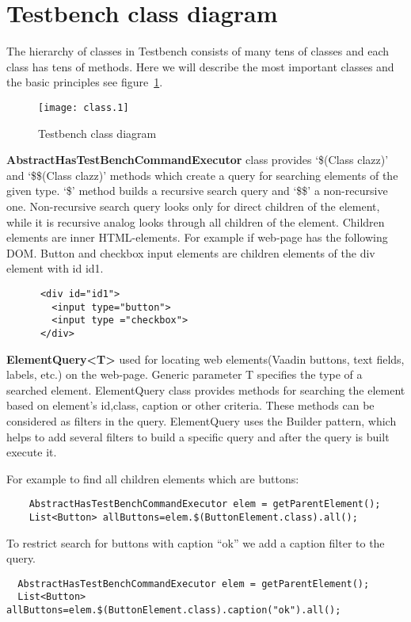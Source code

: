   \section{Testbench class diagram}

  The hierarchy of classes in Testbench consists of many tens of classes and each class has tens of methods.
  Here we will describe the most important classes and the basic principles see
  figure~\ref{fig:classdiagram}.
	\begin{figure}
		\label{fig:classdiagram}
	    \texttt{[image: class.1]}
	    \caption{Testbench class diagram}
    \end{figure}
    
\textbf{AbstractHasTestBenchCommandExecutor} class provides  `\$(Class clazz)'
and `\$\$(Class clazz)' methods which create a query for searching elements of
the given type.
 `\$' method builds a recursive search query and `\$\$' a non-recursive one.
 Non-recursive search query looks only for direct children of the element, while
 it is recursive analog looks through all children of the element. Children
 elements are inner HTML-elements.
   For example if web-page has the following DOM. 
   Button and checkbox input elements are children elements of the div element with id id1.
  \lstset{language=HTML}
    \begin{lstlisting}
      <div id="id1">
        <input type="button">
        <input type ="checkbox">
      </div>
  \end{lstlisting}
  
  
\textbf{ElementQuery<T>} used for locating web elements(Vaadin buttons, text
fields, labels, etc.) on the web-page.
 Generic parameter T specifies the type of a searched element. 
 ElementQuery class provides methods for searching the element based on
 element's id,class, caption or other criteria. These methods can be considered as filters in the query.
 ElementQuery uses the Builder pattern, which helps to add several filters to build a specific query and after
 the query is built execute it.

For example to find all children elements which are buttons:
  \lstset{style=a1listing}
    \begin{lstlisting}
    AbstractHasTestBenchCommandExecutor elem = getParentElement();
    List<Button> allButtons=elem.$(ButtonElement.class).all();
  \end{lstlisting}
  
To restrict search for buttons with caption ``ok'' we add a caption filter to the query.
  \lstset{style=a1listing}
  \begin{lstlisting}
  AbstractHasTestBenchCommandExecutor elem = getParentElement();
  List<Button> allButtons=elem.$(ButtonElement.class).caption("ok").all();
  \end{lstlisting}
  
